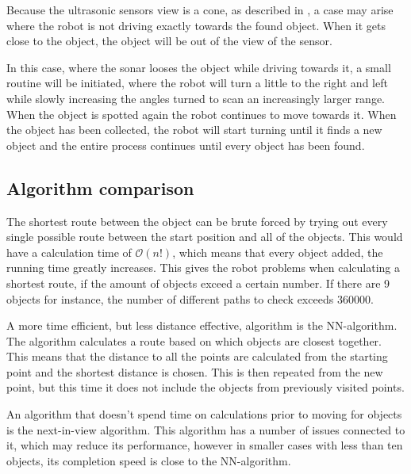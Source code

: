 Because the ultrasonic sensors view is a cone, as described in , a case may arise where the robot is not driving exactly towards the found object. When it gets close to the object, the object will be out of the view of the sensor.

In this case, where the sonar looses the object while driving towards it, a small routine will be initiated, where the robot will turn a little to the right and left while slowly increasing the angles turned to scan an increasingly larger range. When the object is spotted again the robot continues to move towards it. When the object has been collected, the robot will start turning until it finds a new object and the entire process continues until every object has been found.


\subsection{Algorithm comparison} \label{sec:algorithm-desc}
The shortest route between the object can be brute forced by trying out every single possible route between the start position and all of the objects. This would have a calculation time of $\mathcal{O}(n!)$, which means that every object added, the running time greatly increases. This gives the robot problems when calculating a shortest route, if the amount of objects exceed a certain number. If there are 9 objects for instance, the number of different paths to check exceeds 360000. 

A more time efficient, but less distance effective, algorithm is the NN-algorithm. The algorithm calculates a route based on which objects are closest together. This means that the distance to all the points are calculated from the starting point and the shortest distance is chosen. This is then repeated from the new point, but this time it does not include the objects from previously visited points.

An algorithm that doesn't spend time on calculations prior to moving for objects is the next-in-view algorithm. This algorithm has a number of issues connected to it, which may reduce its performance, however in smaller cases with less than ten objects, its completion speed is close to the NN-algorithm.


